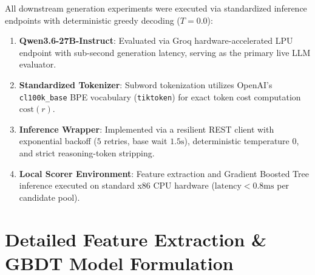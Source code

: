 \documentclass{article}
\begin{document}
All downstream generation experiments were executed via standardized inference endpoints with deterministic greedy decoding ($T = 0.0$):
\begin{enumerate}
\item \textbf{Qwen3.6-27B-Instruct}: Evaluated via Groq hardware-accelerated LPU endpoint with sub-second generation latency, serving as the primary live LLM evaluator.
\item \textbf{Standardized Tokenizer}: Subword tokenization utilizes OpenAI's \texttt{cl100k\_base} BPE vocabulary (\texttt{tiktoken}) for exact token cost computation $\text{cost}(r)$.
\item \textbf{Inference Wrapper}: Implemented via a resilient REST client with exponential backoff ($5$ retries, base wait $1.5\text{s}$), deterministic temperature $0$, and strict reasoning-token stripping.
\item \textbf{Local Scorer Environment}: Feature extraction and Gradient Boosted Tree inference executed on standard x86 CPU hardware ($\text{latency} < 0.8\text{ms}$ per candidate pool).
\end{enumerate}

\section{Detailed Feature Extraction \& GBDT Model Formulation}
\end{document}
